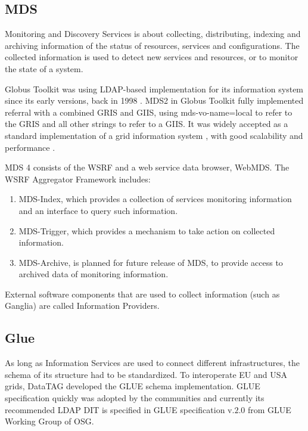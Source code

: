 \subsection{\ac{MDS}}
Monitoring and Discovery Services is about collecting, distributing, indexing and archiving information of the status of resources, services and configurations. The collected information is used to detect new services and resources, or to monitor the state of a system.

Globus Toolkit was using LDAP-based implementation for its information system since its early versions, back in 1998 \cite{von1998usage}. \ac{MDS}2 in Globus Toolkit fully implemented referral with a combined \ac{GRIS} and \ac{GIIS}, using mds-vo-name=local to refer to the \ac{GRIS} and all other strings to refer to a \ac{GIIS}. It was widely accepted as a standard implementation of a grid information system \cite{945188}, with good scalability and performance \cite{zhang2004performance}.


\ac{MDS} 4 consists of the \ac{WSRF} and a web service data browser, WebMDS. The \ac{WSRF} Aggregator Framework includes:

\begin{enumerate}
  \item MDS-Index, which provides a collection of services monitoring information and an interface to query such information.
  \item MDS-Trigger, which provides a mechanism to take action on collected information.
  \item MDS-Archive, is planned for future release of MDS, to provide access to archived data of monitoring information.
\end{enumerate}

External software components that are used to collect information (such as Ganglia)\cite{gangliaWSRF} are called Information Providers.


\subsection{Glue}
As long as Information Services are used to connect different infrastructures, the schema of its structure had to be standardized. To interoperate EU and USA grids, DataTAG developed the \ac{GLUE} schema implementation. \ac{GLUE} specification quickly was adopted by the communities and currently its recommended LDAP \ac{DIT} is specified in \ac{GLUE} specification v.$2.0$ from GLUE Working Group of \ac{OSG}.

